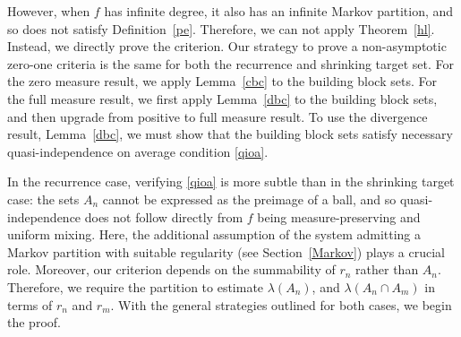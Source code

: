 \documentclass[11pt,reqno]{amsart}
\newcommand{\0}{\mathbf{0}}
\theoremstyle{remark}
\numberwithin{equation}{section}
\theoremstyle{remark}
\numberwithin{equation}{section}
\begin{document}
However, when $f$ has infinite degree, it also has an infinite Markov partition, and so does not satisfy Definition~\ref{pe}. Therefore, we can not apply Theorem~\ref{hl}. Instead, we directly prove the criterion.
Our strategy to prove a non-asymptotic zero-one criteria is the same for both the recurrence and shrinking target set. For the zero measure result, we apply Lemma~\ref{cbc} to the building block sets. For the full measure result, we first apply Lemma~\ref{dbc} to the building block sets, and then upgrade from positive to full measure result. To use the divergence result, Lemma~\ref{dbc}, we must show that the building block sets satisfy necessary quasi-independence on average condition \eqref{qioa}. 

In the recurrence case, verifying \eqref{qioa} is more subtle than in the shrinking target case: the sets $A_n$ cannot be expressed as the preimage of a ball, and so  quasi-independence does not follow directly from  $f$ being measure-preserving and uniform mixing. Here, the additional assumption of the system admitting a Markov partition with suitable regularity (see Section~\ref{Markov}) plays a crucial role. Moreover, our criterion depends on the summability of $r_n$ rather than $A_n$. Therefore, we require the partition to estimate $\lambda(A_n)$, and $\lambda(A_n \cap A_m)$ in terms of $r_n$ and $r_m$.
With the general strategies outlined for both cases, we begin the proof.
\end{document}
